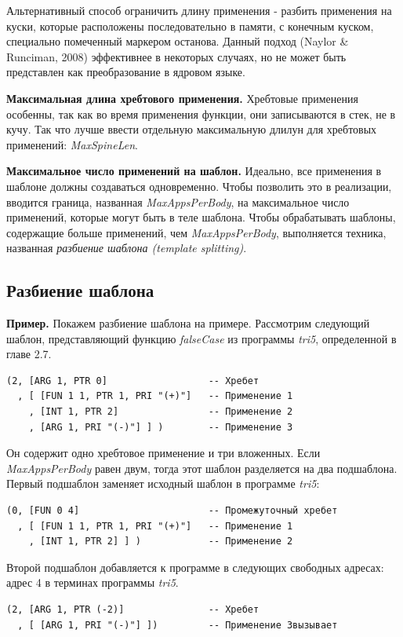 \documentclass[flenqn, 14pt]{extarticle}
\begin{document}
Альтернативный способ ограничить длину применения - разбить применения на куски, которые расположены последовательно в памяти, с конечным куском, специально помеченный маркером останова. Данный подход (Naylor \& Runciman, 2008) эффективнее в некоторых случаях, но не может быть представлен как преобразование в ядровом языке.

\textbf{Максимальная длина хребтового применения.} Хребтовые применения особенны, так как во время применения функции, они записываются в стек, не в кучу. Так что лучше ввести отдельную максимальную длилун для хребтовых применений: \textit{MaxSpineLen}.

\textbf{Максимальное число применений на шаблон.} Идеально, все применения в шаблоне должны создаваться одновременно. Чтобы позволить это в реализации, вводится граница, названная \textit{MaxAppsPerBody}, на максимальное число применений, которые могут быть в теле шаблона. Чтобы обрабатывать шаблоны, содержащие больше применений, чем \textit{MaxAppsPerBody}, выполняется техника, названная \textit{разбиение шаблона (template splitting)}.

\subsection{Разбиение шаблона}
\textbf{Пример.} Покажем разбиение шаблона на примере. Рассмотрим следующий шаблон, представляющий функцию \textit{falseCase} из программы \textit{tri5}, определенной в главе 2.7.
\begin{verbatim}
(2, [ARG 1, PTR 0]                  -- Хребет
  , [ [FUN 1 1, PTR 1, PRI "(+)"]   -- Применение 1
    , [INT 1, PTR 2]                -- Применение 2
    , [ARG 1, PRI "(-)"] ] )        -- Применение 3
\end{verbatim}

Он содержит одно хребтовое применение и три вложенных. Если \textit{MaxAppsPerBody} равен двум, тогда этот шаблон разделяется на два подшаблона. Первый подшаблон заменяет исходный шаблон в программе \textit{tri5}:
\begin{verbatim}
(0, [FUN 0 4]                       -- Промежуточный хребет
  , [ [FUN 1 1, PTR 1, PRI "(+)"]   -- Применение 1
    , [INT 1, PTR 2] ] )            -- Применение 2
\end{verbatim}

Второй подшаблон добавляется к программе в следующих свободных адресах: адрес 4 в терминах программы \textit{tri5}.
\begin{verbatim}
(2, [ARG 1, PTR (-2)]               -- Хребет
  , [ [ARG 1, PRI "(-)"] ])         -- Применение 3вызывает
\end{verbatim}
\end{document}
